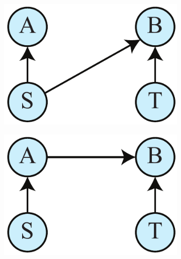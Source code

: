 \documentclass[letterpaper,onecolumn,nofootinbib]{revtex4}
\begin{document}
\begin{figure}[h]
        \begin{subfigure}[b]{0.18\textwidth}
                	\centering
        	\includegraphics[width=\textwidth]{bell-nft-1}
		\subcaption{}
		\label{nohva}
	\end{subfigure}
	\hspace{5em}
        \begin{subfigure}[b]{0.18\textwidth}
                	\centering
        	\includegraphics[width=\textwidth]{bell-nft-2}
             	\subcaption{}
	\label{nohvb}
        \end{subfigure}
        \hspace{5em}
                \begin{subfigure}[b]{0.18\textwidth}
                	\centering

\end{subfigure}
\end{figure}
\end{document}
